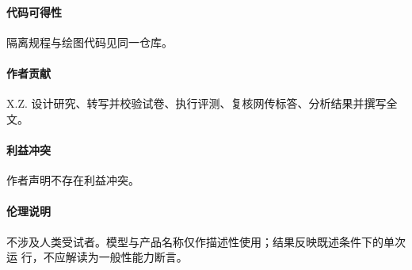 \documentclass[11pt,UTF8]{ctexart}
\theoremstyle{definition}
\begin{document}
\paragraph*{代码可得性}
隔离规程与绘图代码见同一仓库。

\paragraph*{作者贡献}
X.Z. 设计研究、转写并校验试卷、执行评测、复核网传标答、分析结果并撰写全
文。

\paragraph*{利益冲突}
作者声明不存在利益冲突。

\paragraph*{伦理说明}
不涉及人类受试者。模型与产品名称仅作描述性使用；结果反映既述条件下的单次运
行，不应解读为一般性能力断言。
\end{document}
